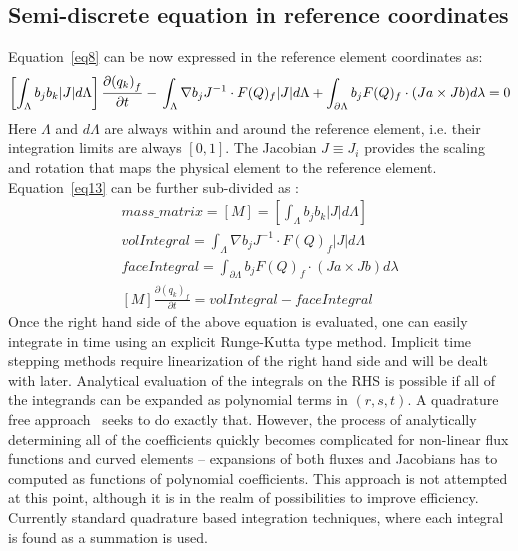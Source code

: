 \documentclass[11pt]{article}
\begin{document}
\subsection{Semi-discrete equation in reference coordinates}
Equation~\ref{eq8} can be now expressed in the reference element coordinates as:
\begin{equation}
  \left[\int_{\Lambda} {b_j} {b_k} |J| d\Lambda\right]\frac{\partial {(q_k)}_f}{\partial t} - \\
  \int_{\Lambda} \nabla b_j J^{-1}
  \cdot F(Q)_f |J| d \Lambda + \int_{\partial\Lambda} b_j F(Q)_f \cdot (J a \times J b) d\lambda  = 0
\label{eq13}
\end{equation}
Here $\Lambda$ and $d\Lambda$ are always within and around the reference element, i.e. their integration limits
are always $[0,1]$. The Jacobian $J\equiv J_i$ provides the scaling and rotation that maps the
physical element to the reference element.
Equation~\ref{eq13} can be further sub-divided as :
\begin{eqnarray}
  mass\_matrix=\left[M\right]=\left[\int_{\Lambda} {b_j} {b_k} |J| d\Lambda\right] \\
  volIntegral = \int_{\Lambda} \nabla b_j J^{-1}\cdot F(Q)_f |J| d \Lambda  \\
  faceIntegral = \int_{\partial\Lambda} b_j F(Q)_f \cdot (J a \times J b) d\lambda\\
  \left[M\right]\frac{\partial {(q_k)}_f}{\partial t} = volIntegral - faceIntegral
\end{eqnarray}
Once the right hand side of the above equation is evaluated, one can easily integrate in time using an explicit
Runge-Kutta type method. Implicit time stepping methods require linearization of the right hand side and will be
dealt with later.  Analytical evaluation of the integrals on the RHS is possible if all of the integrands can be expanded as
polynomial terms in $(r,s,t)$. A quadrature free approach~\cite{atkins} seeks to do exactly that. However, the
process of analytically determining all of the coefficients quickly becomes complicated for non-linear flux functions and
curved elements -- expansions of both fluxes and Jacobians has to computed as functions of polynomial coefficients. This
approach is not attempted at this point, although it is in the realm of possibilities to improve efficiency.
Currently standard quadrature based integration techniques, where each integral is found as a summation is used.
\end{document}
